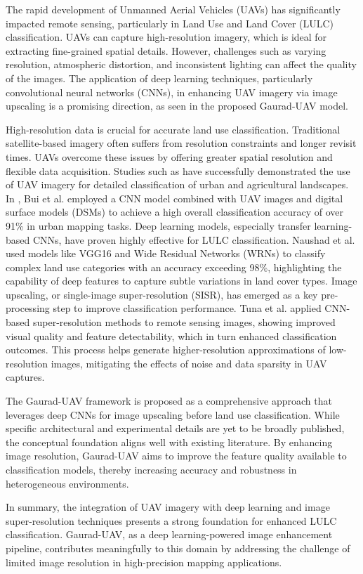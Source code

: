 The rapid development of Unmanned Aerial Vehicles (UAVs) has significantly impacted remote sensing, particularly in Land Use and Land Cover (LULC) classification. UAVs can capture high-resolution imagery, which is ideal for extracting fine-grained spatial details. However, challenges such as varying resolution, atmospheric distortion, and inconsistent lighting can affect the quality of the images. The application of deep learning techniques, particularly convolutional neural networks (CNNs), in enhancing UAV imagery via image upscaling is a promising direction, as seen in the proposed Gaurad-UAV model.

High-resolution data is crucial for accurate land use classification. Traditional satellite-based imagery often suffers from resolution constraints and longer revisit times. UAVs overcome these issues by offering greater spatial resolution and flexible data acquisition. Studies such as \cite{bui2022combination} \cite{naushad2021deep} have successfully demonstrated the use of UAV imagery for detailed classification of urban and agricultural landscapes. In \cite{bui2022combination}, Bui et al. employed a CNN model combined with UAV images and digital surface models (DSMs) to achieve a high overall classification accuracy of over 91\% in urban mapping tasks.
Deep learning models, especially transfer learning-based CNNs, have proven highly effective for LULC classification. Naushad et al. \cite{naushad2021deep} used models like VGG16 and Wide Residual Networks (WRNs) to classify complex land use categories with an accuracy exceeding 98\%, highlighting the capability of deep features to capture subtle variations in land cover types.
Image upscaling, or single-image super-resolution (SISR), has emerged as a key pre-processing step to improve classification performance. Tuna et al. \cite{tuna2018single} applied CNN-based super-resolution methods to remote sensing images, showing improved visual quality and feature detectability, which in turn enhanced classification outcomes. This process helps generate higher-resolution approximations of low-resolution images, mitigating the effects of noise and data sparsity in UAV captures.

The Gaurad-UAV framework is proposed as a comprehensive approach that leverages deep CNNs for image upscaling before land use classification. While specific architectural and experimental details are yet to be broadly published, the conceptual foundation aligns well with existing literature. By enhancing image resolution, Gaurad-UAV aims to improve the feature quality available to classification models, thereby increasing accuracy and robustness in heterogeneous environments.

In summary, the integration of UAV imagery with deep learning and image super-resolution techniques presents a strong foundation for enhanced LULC classification. Gaurad-UAV, as a deep learning-powered image enhancement pipeline, contributes meaningfully to this domain by addressing the challenge of limited image resolution in high-precision mapping applications.